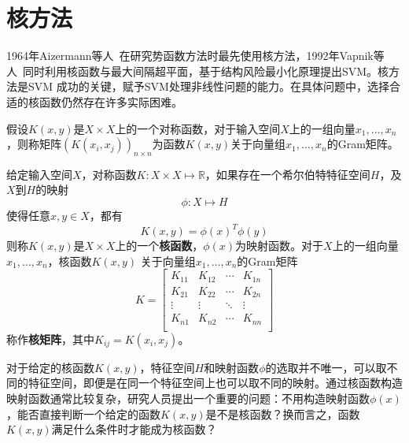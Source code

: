 \section{核方法}
1964年Aizermann等人~\cite{aizerman1964theoretical}在研究势函数方法时最先使用核方法，1992年Vapnik等人~\cite{boser1992training}同时利用核函数与最大间隔超平面，基于结构风险最小化原理提出SVM。核方法是SVM 成功的关键，赋予SVM处理非线性问题的能力。在具体问题中，选择合适的核函数仍然存在许多实际困难。

\begin{definition}[Gram矩阵]
假设$K(x,y)$是$X\times X$上的一个对称函数，对于输入空间$X$上的一组向量$x_1,\ldots,x_n$，则称矩阵$(K(x_i,x_j))_{n\times n}$为函数$K(x,y)$关于向量组$x_1,\ldots,x_n$的Gram矩阵。
\end{definition}

\begin{definition}[核函数与核矩阵]
给定输入空间$X$，对称函数$K:X\times X\mapsto \mathbb R$，如果存在一个希尔伯特特征空间$H$，及$X$到$H$的映射
\begin{equation}
    \phi: X \mapsto H
\end{equation}
使得任意$x,y\in X$，都有
\begin{equation}
    K(x,y) = \phi(x)^T \phi(y)
\end{equation}
则称$K(x,y)$是$X\times X$上的一个\textbf{核函数}，$\phi(x)$为映射函数。对于$X$上的一组向量$x_1,\ldots,x_n$，核函数$K(x,y)$ 关于向量组$x_1,\ldots,x_n$的Gram矩阵
\begin{equation}
    K =
    \begin{bmatrix}
    K_{11}& K_{12} & \cdots & K_{1n}\\
    K_{21}& K_{22} & \cdots & K_{2n}\\
    \vdots & \vdots & \ddots & \vdots\\
    K_{n1}& K_{n2} & \cdots & K_{nn}\\
    \end{bmatrix}
\end{equation}
称作\textbf{核矩阵}，其中$K_{ij}=K(x_i, x_j)$。
\end{definition}
对于给定的核函数$K(x,y)$，特征空间$H$和映射函数$\phi$的选取并不唯一，可以取不同的特征空间，即便是在同一个特征空间上也可以取不同的映射。通过核函数构造映射函数通常比较复杂，研究人员提出一个重要的问题：不用构造映射函数$\phi(x)$，能否直接判断一个给定的函数$K(x,y)$是不是核函数？换而言之，函数$K(x,y)$满足什么条件时才能成为核函数？


